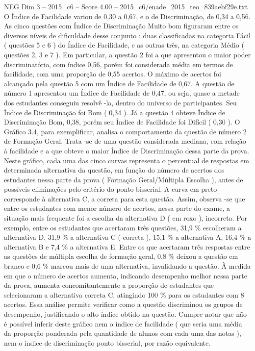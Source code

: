 \begin{textsample}{NEG Dim 3 – 2015\_c6 – Score 4.00 – 2015\_c6/enade\_2015\_teo\_839aebf29e.txt}
O Índice de Facilidade variou de 0,30 a 0,67, e o de Discriminação, de 0,34 a 0,56.
As cinco questões com Índice de Discriminação Muito bom figuraram entre os diversos níveis de dificuldade desse conjunto : duas classificadas na categoria Fácil ( questões 5 e 6 ) do Índice de Facilidade, e as outras três, na categoria Médio ( questões 2, 3 e 7 ).
Em particular, a questão 2 foi a que apresentou o maior poder discriminatório, com índice 0,56, porém foi considerada média em termos de facilidade, com uma proporção de 0,55 acertos.
O máximo de acertos foi alcançado pela questão 5 com um Índice de Facilidade de 0,67.
A questão de número 1 apresentou um Índice de Facilidade de 0,47, ou seja, quase a metade dos estudantes conseguiu resolvê -la, dentro do universo de participantes.
Seu Índice de Discriminação foi Bom ( 0,34 ).
Já a questão 4 obteve Índice de Discriminação Bom, 0,38, porém seu Índice de Facilidade foi Difícil ( 0,30 ).
O Gráfico 3.4, para exemplificar, analisa o comportamento da questão de número 2 de Formação Geral.
Trata -se de uma questão considerada mediana, com relação à facilidade e a que obteve o maior Índice de Discriminação dessa parte da prova.
Neste gráfico, cada uma das cinco curvas representa o percentual de respostas em determinada alternativa da questão, em função do número de acertos dos estudantes nessa parte da prova ( Formação Geral/Múltipla Escolha ), antes de possíveis eliminações pelo critério do ponto bisserial.
A curva em preto corresponde à alternativa C, a correta para esta questão.
Assim, observa -se que entre os estudantes com menor número de acertos, nessa parte do exame, a situação mais frequente foi a escolha da alternativa D ( em roxo ), incorreta.
Por exemplo, entre os estudantes que acertaram três questões, 31,9 \% escolheram a alternativa D, 31,9 \% a alternativa C ( correta ), 15,1 \% a alternativa A, 16,4 \% a alternativa B e 7,4 \% a alternativa E.
Entre os que acertaram três respostas entre as questões de múltipla escolha de formação geral, 0,8 \% deixou a questão em branco e 0,6 \% marcou mais de uma alternativa, invalidando a questão.
À medida em que o número de acertos aumenta, indicando desempenho melhor nessa parte da prova, aumenta concomitantemente a proporção de estudantes que selecionaram a alternativa correta C, atingindo 100 \% para os estudantes com 8 acertos.
Essa análise permite verificar como a questão discriminou os grupos de desempenho, justificando o alto índice obtido na questão.
Cumpre notar que não é possível inferir deste gráfico nem o índice de facilidade ( que seria uma média da proporção ponderada pela quantidade de alunos com cada uma das notas ), nem o índice de discriminação ponto bisserial, por razão equivalente.

\end{textsample}
